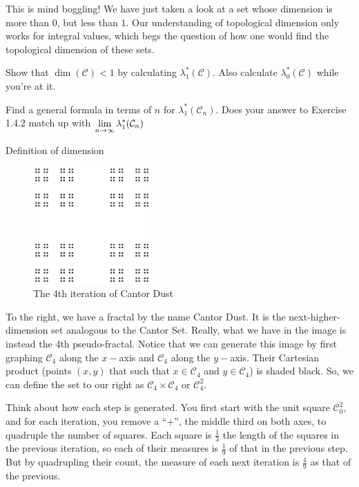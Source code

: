 This is mind boggling! We have just taken a look at a set whose dimension is more than $0$, but less than $1$. Our understanding of topological dimension only works for integral values, which begs the question of how one would find the topological dimension of these sets. 

\begin{exercise}
    Show that $\dim (\mathcal{C})<1$ by calculating $\lambda^*_1(\mathcal{C})$. Also calculate $\lambda^*_0(\mathcal{C})$ while you're at it.
\end{exercise}

\begin{exercise}
    Find a general formula in terms of $n$ for $\lambda^*_1(\mathcal{C}_{n})$. Does your answer to Exercise 1.4.2 match up with $\displaystyle\lim_{n\to\infty}\lambda^*_1(\mathcal{C}_{n})$
\end{exercise}

Definition of dimension

\begin{figure}
  \begin{center}
    \includegraphics[width=0.4\textwidth]{Images/1.4.4.png}
  \end{center}
  \caption{The 4th iteration of Cantor Dust}
\end{figure}

To the right, we have a fractal by the name Cantor Dust. It is the next-higher-dimension set analogous to the Cantor Set. Really, what we have in the image is instead the 4th pseudo-fractal. Notice that we can generate this image by first graphing $\mathcal{C}_4$ along the $x-$axis and $\mathcal{C}_4$ along the $y-$axis. Their Cartesian product (points $(x,y)$ that such that $x\in\mathcal{C}_4$ and $y\in\mathcal{C}_4$) is shaded black. So, we can define the set to our right as $\mathcal{C}_4\times \mathcal{C}_4$ or $\mathcal{C}^2_4$. \par

Think about how each step is generated. You first start with the unit square $\mathcal{C}^2_0$, and for each iteration, you remove a ``+'', the middle third on both axes, to quadruple the number of squares. Each square is $\frac{1}{3}$ the length of the squares in the previous iteration, so each of their measures is $\frac{1}{9}$ of that in the previous step. But by quadrupling their count, the measure of each next iteration is $\frac{4}{9}$ as that of the previous. 

